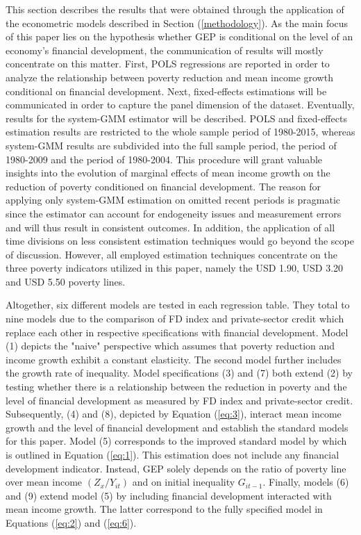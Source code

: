 \documentclass[12pt, a4paper]{article}
\begin{document}
This section describes the results that were obtained through the application of the econometric models described in Section (\ref{methodology}). As the main focus of this paper lies on the hypothesis whether GEP is conditional on the level of an economy's financial development, the communication of results will mostly concentrate on this matter. First, POLS regressions are reported in order to analyze the relationship between poverty reduction and mean income growth conditional on financial development. Next, fixed-effects estimations will be communicated in order to capture the panel dimension of the dataset. Eventually, results for the system-GMM estimator will be described. POLS and fixed-effects estimation results are restricted to the whole sample period of 1980-2015, whereas system-GMM results are subdivided into the full sample period, the period of 1980-2009 and the period of 1980-2004. This procedure will grant valuable insights into the evolution of marginal effects of mean income growth on the reduction of poverty conditioned on financial development. The reason for applying only system-GMM estimation on omitted recent periods is pragmatic since the estimator can account for endogeneity issues and measurement errors and will thus result in consistent outcomes. In addition, the application of all time divisions on less consistent estimation techniques would go beyond the scope of discussion. However, all employed estimation techniques concentrate on the three poverty indicators utilized in this paper, namely the USD 1.90, USD 3.20 and USD 5.50 poverty lines.

Altogether, six different models are tested in each regression table. They total to nine models due to the comparison of FD index and private-sector credit which replace each other in respective specifications with financial development. Model (1) depicts the "naive" perspective which assumes that poverty reduction and income growth exhibit a constant elasticity. The second model further includes the growth rate of inequality. Model specifications (3) and (7) both extend (2) by testing whether there is a relationship between the reduction in poverty and the level of financial development as measured by FD index and private-sector credit. Subsequently, (4) and (8), depicted by Equation (\ref{eq:3}), interact mean income growth and the level of financial development and establish the standard models for this paper. Model (5) corresponds to the improved standard model by  which is outlined in Equation (\ref{eq:1}). This estimation does not include any financial development indicator. Instead, GEP solely depends on the ratio of poverty line over mean income $(Z_{x}/Y_{it})$ and on initial inequality $G_{it-1}$. Finally, models (6) and (9) extend model (5) by including financial development interacted with mean income growth. The latter correspond to the fully specified model in Equations (\ref{eq:2}) and (\ref{eq:6}).
\end{document}
